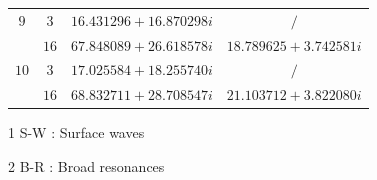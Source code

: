 \documentclass[aps,prd,longbibliography,reprint,twocolumn,amsmath,amssymb,amsfonts,showpacs,superscriptaddress]{revtex4-1}%
\begin{document}
\begin{table}[htp]
\begin{threeparttable}[htp]
\begin{ruledtabular}
\begin{tabular}{cccc}
$9$  & $3$  & $16.431296+16.870298 i $  & $/ $      \\
     & $16$ & $67.848089+26.618578 i $  & $18.789625+3.742581 i $
         \\

$10$  & $3$  & $17.025584+18.255740 i $  & $/ $     \\
     & $16$  & $68.832711+28.708547 i  $  & $21.103712+3.822080 i $
        \\
\end{tabular}
\end{ruledtabular}
\begin{tablenotes}
     \item[1] S-W : Surface waves
     \item[2] B-R : Broad resonances
   \end{tablenotes}
\end{threeparttable}
\end{table}
\endgroup
\end{document}
